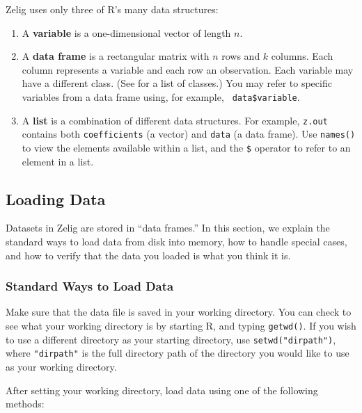 Zelig uses only three of R's many data structures: 
\begin{enumerate}
\item A {\bf variable} is a one-dimensional vector of length $n$.
\item A {\bf data frame} is a rectangular matrix with $n$ rows and $k$
  columns.  Each column represents a variable and each row an
  observation.  Each variable may have a different class.  (See
   for a list of classes.)  You may refer to
  specific variables from a data frame using, for example, {\tt
    data\$variable}.
\item A {\bf list} is a combination of different data structures.  For
  example, {\tt z.out} contains both {\tt coefficients} (a vector) and
  {\tt data} (a data frame).  Use {\tt names()} to view the elements
  available within a list, and the {\tt \$} operator to refer to an
  element in a list.
\end{enumerate}

\subsection{Loading Data}\label{load.data}

Datasets in Zelig are stored in ``data frames.'' In this section, we
explain the standard ways to load data from disk into memory, how to
handle special cases, and how to verify that the data you loaded is
what you think it is.

\subsubsection*{Standard Ways to Load Data}

Make sure that the data file is saved in your working directory.  You
can check to see what your working directory is by starting R, and
typing {\tt getwd()}.  If you wish to use a different directory as
your starting directory, use \verb|setwd("dirpath")|, where
\verb|"dirpath"| is the full directory path of the directory you would
like to use as your working directory.  

After setting your working directory, load data using one of the
following methods:  

